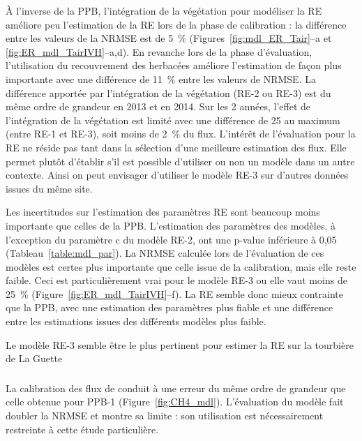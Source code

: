 À l'inverse de la PPB, l'intégration de la végétation pour modéliser la RE améliore peu l'estimation de la RE lors de la phase de calibration : la différence entre les valeurs de la NRMSE est de \SI{5}{\percent} (Figures~\ref{fig:mdl_ER_Tair}--a et \ref{fig:ER_mdl_TairIVH}--a,d).
En revanche lors de la phase d'évaluation, l'utilisation du recouvrement des herbacées améliore l'estimation de façon plus importante avec une différence de \SI{11}{\percent} entre les valeurs de NRMSE.
La différence apportée par l'intégration de la végétation (RE-2 ou RE-3) est du même ordre de grandeur en 2013 et en 2014.
Sur les 2 années, l'effet de l'intégration de la végétation est limité avec une différence de \SI{25}{\gcma} au maximum (entre RE-1 et RE-3), soit moins de \SI{2}{\percent} du flux.
L'intérêt de l'évaluation pour la RE ne réside pas tant dans la sélection d'une meilleure estimation des flux.
Elle permet plutôt d'établir s'il est possible d'utiliser ou non un modèle dans un autre contexte.
Ainsi on peut envisager d'utiliser le modèle RE-3 sur d'autres données issues du même site.

Les incertitudes sur l'estimation des paramètres RE sont beaucoup moins importante que celles de la PPB.
L'estimation des paramètres des modèles, à l'exception du paramètre c du modèle RE-2, ont une p-value inférieure à 0,05 (Tableau~\ref{table:mdl_par}).
La NRMSE calculée lors de l'évaluation de ces modèles est certes plus importante que celle issue de la calibration, mais elle reste faible.
Ceci est particulièrement vrai pour le modèle RE-3 ou elle vaut moins de \SI{25}{\percent} (Figure~\ref{fig:ER_mdl_TairIVH}--f).
La RE semble donc mieux contrainte que la PPB, avec une estimation des paramètres plus fiable et une différence entre les estimations issues des différents modèles plus faible.

Le modèle RE-3 semble être le plus pertinent pour estimer la RE sur la tourbière de La Guette

\subsubsection{\fchh}
La calibration des flux de \chh conduit à une erreur du même ordre de grandeur que celle obtenue pour PPB-1 (Figure~\ref{fig:CH4_mdl}). 
L'évaluation du modèle fait doubler la NRMSE et montre sa limite : son utilisation est nécessairement restreinte à cette étude particulière.


